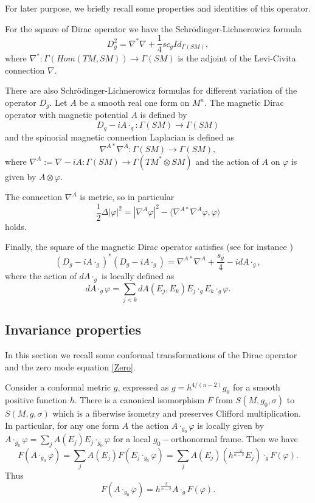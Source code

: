 \documentclass[11pt]{amsart}
\theoremstyle{plain}
\numberwithin{equation}{section}
\theoremstyle{plain}
\begin{document}
For later purpose, we briefly recall some properties and identities of this operator.
 
For the square of Dirac operator we have the Schr\"odinger-Lichnerowicz formula
$$D_g^2=\nabla^*\nabla+\frac{1}{4}sc_gId_{\Gamma(SM)},$$
where $\nabla^*:\Gamma(Hom(TM,SM))\rightarrow\Gamma(SM)$ is the adjoint of the Levi-Civita connection $\nabla$.

There are also Schr\"odinger-Lichnerowicz formulas for different variation of the operator $D_g$. Let $A$ be a smooth real one form on $M^n$. The magnetic Dirac operator with magnetic potential $A$ is defined by $$D_g-iA\cdot_g:\Gamma(SM)\rightarrow\Gamma(SM)$$
and the spinorial magnetic connection Laplacian is defined as
$$\nabla^{A*}\nabla^A:\Gamma(SM)\rightarrow\Gamma(SM),$$
where $\nabla^A:=\nabla-iA:\Gamma(SM)\rightarrow\Gamma(TM^*\otimes SM)$ and the action of $A$ on $\varphi$ is given by $A\otimes\varphi$.

The connection $\nabla^A$ is metric, so in particular
$$\frac{1}{2}\Delta|\varphi|^2=|\nabla^A\varphi|^2-\langle\nabla^{A*}\nabla^A\varphi,\varphi\rangle$$
holds.

Finally, the square of the magnetic Dirac operator satisfies (see for instance \cite{Nadine})
\begin{equation}\label{squaremagnetic}
\left( D_g-iA\cdot_g\right)^*\left( D_g-iA\cdot_g\right)=\nabla^{A*}\nabla^A+\frac{s_g}{4}-idA\cdot_g,
\end{equation}
where the action of $dA\cdot_g$ is locally defined as $$dA\cdot_g\varphi=\sum\limits_{j<k}dA(E_j,E_k)E_j\cdot_gE_k\cdot_g\varphi.$$





\subsection{Invariance properties}
In this section we recall some conformal transformations of the Dirac operator and the zero mode equation \eqref{Zero}.

Consider a conformal metric $g$, expressed as $g=h^{4/(n-2)}g_0$ for a smooth positive function $h$. There is a canonical isomorphism $F$ from  $S(M,g_0,\sigma)$ to $S(M,g,\sigma)$ which is a fiberwise isometry and preserves Clifford multiplication. In particular, for any one form $A$ the action $A\cdot_{g_0}\varphi$ is locally given by $A\cdot_{g_0}\varphi=\sum_{j}A(E_j)E_j\cdot_{g_0}\varphi$ for a local $g_0-$orthonormal frame. Then we have
$$F(A\cdot_{g_0}\varphi)=\sum_j A(E_j)F(E_j\cdot_{g_0}\varphi)=\sum_jA(E_j)(h^{\frac{-2}{n-2}}E_j)\cdot_{g}F(\varphi).$$
Thus $$F(A\cdot_{g_0}\varphi)=h^{\frac{2}{n-2}}A\cdot_gF(\varphi).$$
\end{document}
